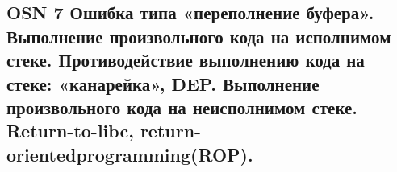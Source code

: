 \subsection{OSN 7 Ошибка типа «переполнение буфера». Выполнение произвольного кода на исполнимом стеке. Противодействие выполнению кода на стеке: «канарейка»,
DEP. Выполнение произвольного кода на неисполнимом стеке. Return-to-libc, return-orientedprogramming(ROP).}
